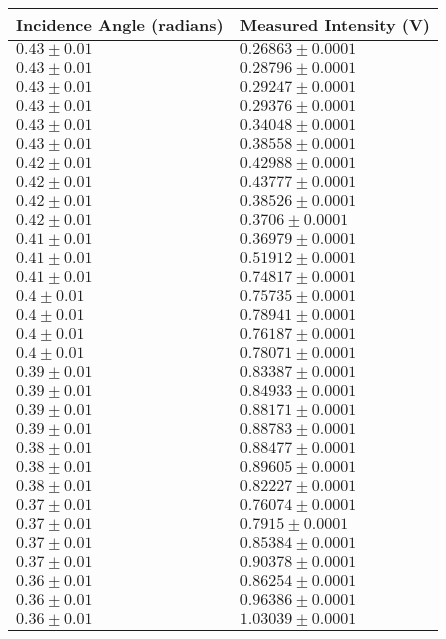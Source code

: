 \begin{tabular}{| p{} | p{} |}
\hline
Incidence Angle (radians) & Measured Intensity (V)\\
\hline
$0.43 \pm 0.01$ & $0.26863 \pm 0.0001$\\
$0.43 \pm 0.01$ & $0.28796 \pm 0.0001$\\
$0.43 \pm 0.01$ & $0.29247 \pm 0.0001$\\
$0.43 \pm 0.01$ & $0.29376 \pm 0.0001$\\
$0.43 \pm 0.01$ & $0.34048 \pm 0.0001$\\
$0.43 \pm 0.01$ & $0.38558 \pm 0.0001$\\
$0.42 \pm 0.01$ & $0.42988 \pm 0.0001$\\
$0.42 \pm 0.01$ & $0.43777 \pm 0.0001$\\
$0.42 \pm 0.01$ & $0.38526 \pm 0.0001$\\
$0.42 \pm 0.01$ & $0.3706 \pm 0.0001$\\
$0.41 \pm 0.01$ & $0.36979 \pm 0.0001$\\
$0.41 \pm 0.01$ & $0.51912 \pm 0.0001$\\
$0.41 \pm 0.01$ & $0.74817 \pm 0.0001$\\
$0.4 \pm 0.01$ & $0.75735 \pm 0.0001$\\
$0.4 \pm 0.01$ & $0.78941 \pm 0.0001$\\
$0.4 \pm 0.01$ & $0.76187 \pm 0.0001$\\
$0.4 \pm 0.01$ & $0.78071 \pm 0.0001$\\
$0.39 \pm 0.01$ & $0.83387 \pm 0.0001$\\
$0.39 \pm 0.01$ & $0.84933 \pm 0.0001$\\
$0.39 \pm 0.01$ & $0.88171 \pm 0.0001$\\
$0.39 \pm 0.01$ & $0.88783 \pm 0.0001$\\
$0.38 \pm 0.01$ & $0.88477 \pm 0.0001$\\
$0.38 \pm 0.01$ & $0.89605 \pm 0.0001$\\
$0.38 \pm 0.01$ & $0.82227 \pm 0.0001$\\
$0.37 \pm 0.01$ & $0.76074 \pm 0.0001$\\
$0.37 \pm 0.01$ & $0.7915 \pm 0.0001$\\
$0.37 \pm 0.01$ & $0.85384 \pm 0.0001$\\
$0.37 \pm 0.01$ & $0.90378 \pm 0.0001$\\
$0.36 \pm 0.01$ & $0.86254 \pm 0.0001$\\
$0.36 \pm 0.01$ & $0.96386 \pm 0.0001$\\
$0.36 \pm 0.01$ & $1.03039 \pm 0.0001$\\
\hline
\end{tabular}\\
